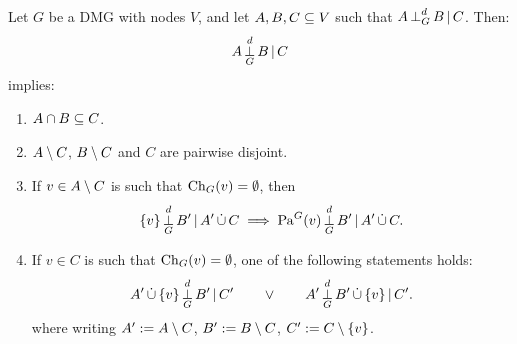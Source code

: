 \begin{Lem}\label{lem:d-separation-markov-property}
  Let $G$ be a DMG with nodes $V$, and let $A,B,C \subseteq V$ such that $A \operatorname*{\perp}_G^d B \operatorname*{|} C$.
  Then:
    $$A \operatorname*{\perp}_G^d B \operatorname*{|} C$$
  implies:
  \begin{enumerate}[label=\roman*)]
    \item $A \cap B \subseteq C$.
    \item $A\setminus C$, $B \setminus C$ and $C$ are pairwise disjoint.
    \item If $v \in A \setminus C$ is such that $\mathrm{Ch}_G(v) = \emptyset$, then
      $$\{v\} \operatorname*{\perp}^d_G B' \operatorname*{|} A' \,\dot{\cup}\, C \implies \mathrm{Pa}^G(v) \operatorname*{\perp}^d_G B' \operatorname*{|} A' \,\dot{\cup}\, C.$$
    \item If $v \in C$ is such that $\mathrm{Ch}_G(v) = \emptyset$, one of the following statements holds:
      \[  A' \,\dot{\cup}\, \{v\} \operatorname*{\perp}^d_G  B' \operatorname*{|} C' \qquad \lor \qquad A' \operatorname*{\perp}^d_G B' \,\dot{\cup}\, \{v\} \operatorname*{|} C'. \]
      where writing $A' := A \setminus C$, $B' := B \setminus C$, $C' := C \setminus \{v\}$. 
  \end{enumerate}
\end{Lem}
